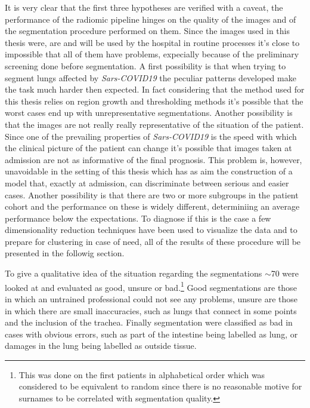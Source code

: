 It is very clear that the first three hypotheses are verified with a caveat, the performance of the radiomic pipeline hinges on the quality of the images and of the segmentation procedure performed on them. Since the images used in this thesis were, are and will be used by the hospital in routine processes it's close to impossible that all of them have problems, expecially because of the preliminary screening done before segmentation.
A first possibility is that when trying to segment lungs affected by \textit{Sars-COVID19} the peculiar patterns developed make the task much harder then expected.
In fact considering that the method used for this thesis relies on region growth and thresholding methods it's possible that the worst cases end up with unrepresentative segmentations.
Another possibility is that the images are not really really representative of the situation of the patient. Since one of the prevailing properties of \textit{Sars-COVID19} is the speed with which the clinical picture of the patient can change it's possible that images taken at admission are not as informative of the final prognosis. This problem is, however, unavoidable in the setting of this thesis which has as aim the construction of a model that, exactly at admission, can discriminate between serious and easier cases.
Another possibility is that there are two or more subgroups in the patient cohort and the performance on these is widely different, determiniing an average performance below the expectations.
To diagnose if this is the case a few dimensionality reduction techniques have been used to visualize the data and to prepare for clustering in case of need, all of the results of these procedure will be presented in the followig section.	

To give a qualitative idea of the situation regarding the segmentations $\sim$70 were looked at and evaluated as good, unsure or bad.\footnote{This was done on the first patients in alphabetical order which was considered to be equivalent to random since there is no reasonable motive for surnames to be correlated with segmentation quality.}
Good segmentations are those in which an untrained professional could not see any problems, unsure are those in which there are small inaccuracies, such as lungs that connect in some points and the inclusion of the trachea. 
Finally segmentation were classified as bad in cases with obvious errors, such as part of the intestine being labelled as lung, or damages in the lung being labelled as outside tissue.

